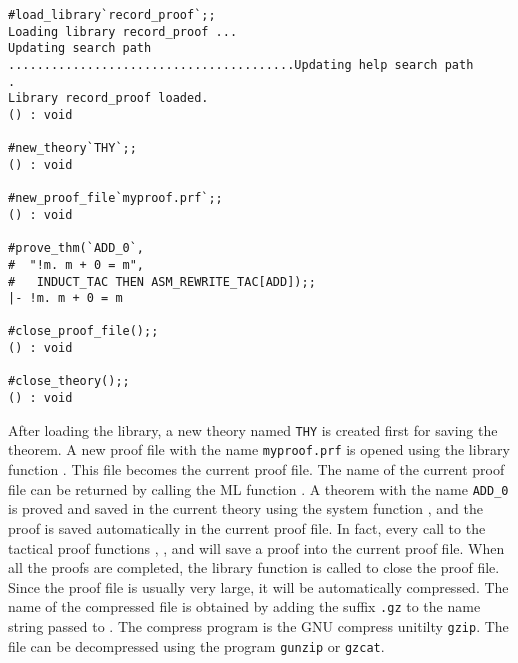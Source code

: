 \begin{session}
\begin{verbatim}
#load_library`record_proof`;;
Loading library record_proof ...
Updating search path
........................................Updating help search path
.
Library record_proof loaded.
() : void

#new_theory`THY`;;
() : void

#new_proof_file`myproof.prf`;;
() : void

#prove_thm(`ADD_0`,
#  "!m. m + 0 = m",
#   INDUCT_TAC THEN ASM_REWRITE_TAC[ADD]);;
|- !m. m + 0 = m

#close_proof_file();;
() : void

#close_theory();;
() : void
\end{verbatim}
\end{session}
After loading the library, a new theory named {\tt THY} is created first for
saving the theorem. A new proof file with the name {\tt myproof.prf}
is opened using the library function . This
file becomes the current proof file. The name of the current proof
file can be returned by calling the ML function
. A theorem with 
the name {\tt ADD\_0} is proved and saved in the current theory using
the system function , and the proof is saved
automatically in the current proof file. In fact, every call to the
tactical proof functions , ,
 and  will save a proof into the
current proof file. When all the proofs are completed, the library
function  is called to close the proof file.
Since the proof file is usually very large, it will be automatically
compressed. The name of the compressed file is obtained by adding the
suffix {\tt .gz} to the name string passed to .
The compress program is the GNU compress unitilty {\tt gzip}. The file
can be decompressed using the program {\tt gunzip} or {\tt gzcat}.

